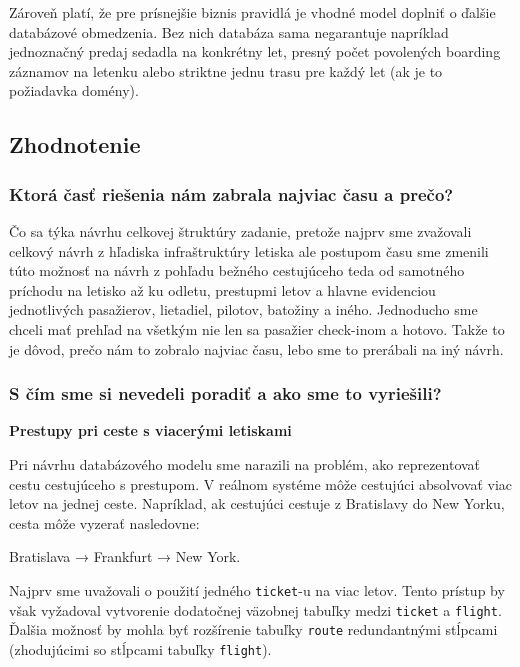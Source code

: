 \documentclass[11pt, a4paper]{article}
\begin{document}
Zároveň platí, že pre prísnejšie biznis pravidlá je vhodné model doplniť o
ďalšie databázové obmedzenia. Bez nich databáza sama negarantuje napríklad
jednoznačný predaj sedadla na konkrétny let, presný počet povolených boarding
záznamov na letenku alebo striktne jednu trasu pre každý let (ak je to
požiadavka domény).


\subsection{Zhodnotenie}


\subsubsection*{Ktorá časť riešenia nám zabrala najviac času a prečo?}

Čo sa týka návrhu celkovej štruktúry zadanie, pretože najprv sme zvažovali celkový návrh z hľadiska infraštruktúry letiska ale postupom času sme zmenili túto možnosť na návrh z pohľadu bežného cestujúceho teda od samotného príchodu na letisko až ku odletu, prestupmi letov a hlavne evidenciou jednotlivých pasažierov, lietadiel, pilotov, batožiny a iného. Jednoducho sme chceli mať prehľad na všetkým nie len sa pasažier check-inom a hotovo. Takže to je dôvod, prečo nám to zobralo najviac času, lebo sme to prerábali na iný návrh. 

\subsubsection*{S čím sme si nevedeli poradiť a ako sme to vyriešili?}

\textbf{Prestupy pri ceste s viacerými letiskami}

Pri návrhu databázového modelu sme narazili na problém, ako reprezentovať cestu cestujúceho s prestupom. 
V reálnom systéme môže cestujúci absolvovať viac letov na jednej ceste. Napríklad, ak cestujúci cestuje z Bratislavy do New Yorku, cesta môže vyzerať nasledovne:
\begin{center}
    Bratislava → Frankfurt → New York. \\
\end{center} 

Najprv sme uvažovali o použití jedného \texttt{ticket}-u na viac letov. Tento prístup by však vyžadoval vytvorenie dodatočnej väzobnej tabuľky medzi \texttt{ticket} a \texttt{flight}. Ďalšia možnosť by mohla byť rozšírenie tabuľky \texttt{route} redundantnými stĺpcami (zhodujúcimi so stĺpcami tabuľky \texttt{flight}).
\end{document}
